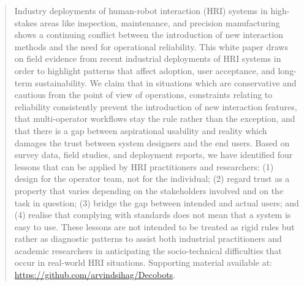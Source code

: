 \documentclass[sigconf, nonacm] {acmart}
\begin{document}
\begin{abstract}
Industry deployments of human-robot interaction (HRI) systems in high-stakes areas like inspection, maintenance, and precision manufacturing shows a continuing conflict between the introduction of new interaction methods and the need for operational reliability. This white paper draws on field evidence from recent industrial deployments of HRI systems in order to highlight patterns that affect adoption, user acceptance, and long-term sustainability. We claim that in situations which are conservative and cautious from the point of view of operations, constraints relating to reliability consistently prevent the introduction of new interaction features, that multi-operator workflows stay the rule rather than the exception, and that there is a gap between aspirational usability and reality which damages the trust between system designers and the end users. Based on survey data, field studies, and deployment reports, we have identified four lessons that can be applied by HRI practitioners and researchers: (1) design for the operator team, not for the individual; (2) regard trust as a property that varies depending on the stakeholders involved and on the task in question; (3) bridge the gap between intended and actual users; and (4) realise that complying with standards does not mean that a system is easy to use. These lessons are not intended to be treated as rigid rules but rather as diagnostic patterns to assist both industrial practitioners and academic researchers in anticipating the socio-technical difficulties that occur in real-world HRI situations.
Supporting material available at: \href{https://github.com/arvindsihag/Decobots}{https://github.com/arvindsihag/Decobots}.


\end{abstract}

\end{document}

